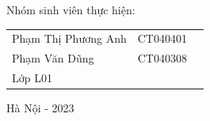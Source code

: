 \begin{titlepage}
\begin{flushleft}
\begin{tabular}{l c}
		\end{tabular}
		
		\vspace{0.6cm}
		
		\hspace{3cm}Nhóm sinh viên thực hiện:
		
		\begin{tabular}{l c c}
			
			\hspace{4cm}Phạm Thị Phương Anh & CT040401 \\
			
			\hspace{4cm}Phạm Văn Dũng & CT040308 \\
			
			\hspace{4cm}Lớp L01
			
			
		\end{tabular}
		
	\end{flushleft}
	
	\begin{center}
		
		\vspace{1cm}
		
		Hà Nội - 2023
		
	\end{center}
\end{titlepage}